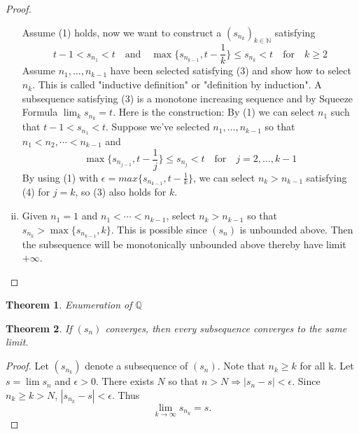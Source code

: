 \documentclass[12pt, lettersize]{book}
\newtheorem{thm}{Theorem}[section]
\newcommand{\Q}{\mathbb{Q}}
\begin{document}
\begin{proof}
\begin{enumerate}[(i)]
			Assume (1) holds, now we want to construct a $(s_{n_k})_{k\in\mathbb{N}}$ satisfying
			\begin{equation}
				t-1<s_{n_1}<t\quad\text{and}\quad\max\{s_{n_{k-1}},t-\frac{1}{k}\}\leq s_{n_k}<t\quad\text{for}\quad k\geq2
			\end{equation}
			Assume $n_1,\dots,n_{k-1}$ have been selected satisfying (3) and show how to select $n_k$. This is called "inductive definition" or "definition by induction". A subsequence satisfying (3) is a monotone increasing sequence and by Squeeze Formula $\lim_ks_{n_k}=t$. Here is the construction:
			By (1) we can select $n_1$ such that $t-1<s_{n_1}<t$. Suppose we've selected $n_1,\dots,n_{k-1}$ so that $n_1<n_2,\cdots<n_{k-1}$ and
			\begin{equation}
				\max\{s_{n_{j-1}},t-\frac{1}{j}\}\leq s_{n_j}<t\quad\text{for}\quad j=2,\dots,k-1
			\end{equation}
			By using (1) with $\epsilon=max\{s_{n_{k-1}},t-\frac{1}{k}\}$, we can select $n_k>n_{k-1}$ satisfying (4) for $j=k$, so (3) also holds for $k$. 
			\item Given $n_1=1$ and $n_1<\cdots<n_{k-1}$, select $n_k>n_{k-1}$ so that $s_{n_k}>\max\{s_{n_{k-1}},k\}$. This is possible since $(s_n)$ is unbounded above. Then the subsequence will be monotonically unbounded above thereby have limit $+\infty$.
		\end{enumerate}
		\end{proof}
		
		\begin{thm}
			Enumeration of $\Q$
		\end{thm}
		
		\begin{thm}\label{def:subsequence converges to the same limit}
		If $(s_n)$ converges, then every subsequence converges to the same limit.
		\end{thm}
		\begin{proof}
		Let $(s_{n_k})$ denote a subsequence of $(s_n)$. Note that $n_k\geq k$ for all k. Let $s=\lim s_n$ and $\epsilon>0$. There exists $N$ so that $n>N\Rightarrow|s_n-s|<\epsilon$. Since $n_k\geq k>N$, $|s_{n_k}-s|<\epsilon$. Thus
		\begin{displaymath}
			\lim\limits_{k\rightarrow\infty}s_{n_k}=s.
		\end{displaymath}
		\end{proof}
		
\end{document}
